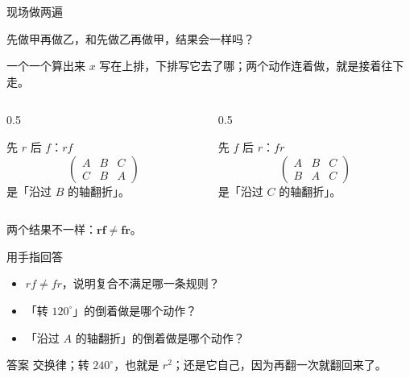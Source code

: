 \documentclass[10pt]{beamer}
\begin{document}
\begin{frame}{现场做两遍}
  \pause
  \begin{center}
    先做甲再做乙，和先做乙再做甲，结果会一样吗？
  \end{center}
\end{frame}

\begin{frame}{一个一个算出来}
  \(x\) 写在上排，下排写它去了哪；两个动作连着做，就是接着往下走。
  \pause
  \begin{columns}[T]
    \begin{column}{0.5\textwidth}
      \begin{block}{先 \(r\) 后 \(f\)：\(rf\)}
        \[
          \begin{pmatrix}A&B&C\\C&B&A\end{pmatrix}
        \]
        是「沿过 \(B\) 的轴翻折」。
      \end{block}
    \end{column}
    \begin{column}{0.5\textwidth}
      \begin{block}{先 \(f\) 后 \(r\)：\(fr\)}
        \[
          \begin{pmatrix}A&B&C\\B&A&C\end{pmatrix}
        \]
        是「沿过 \(C\) 的轴翻折」。
      \end{block}
    \end{column}
  \end{columns}
  \pause
  \begin{center}
    {\large 两个结果不一样：\(\mathbf{rf\neq fr}\)。}
  \end{center}
\end{frame}

\begin{frame}{用手指回答}
  \begin{itemize}
    \item \(rf\neq fr\)，说明复合不满足哪一条规则？
    \item 「转 \(120^\circ\)」的倒着做是哪个动作？
    \item 「沿过 \(A\) 的轴翻折」的倒着做是哪个动作？
  \end{itemize}
  \pause
  \begin{block}{答案}
    交换律；\quad 转 \(240^\circ\)，也就是 \(r^2\)；\quad 还是它自己，因为再翻一次就翻回来了。
  \end{block}
\end{frame}
\end{document}

